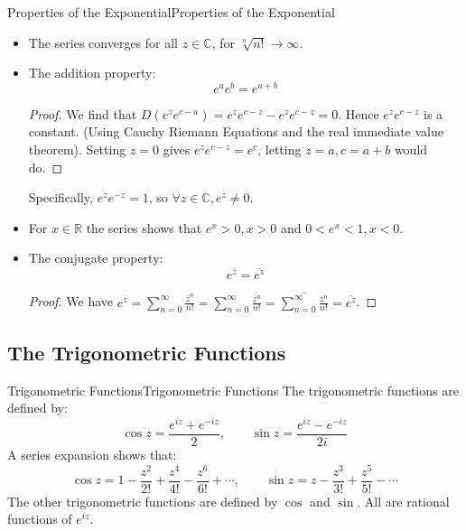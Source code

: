 \documentclass[../main.tex]{subfiles}
\begin{document}
\begin{proposition}{Properties of the Exponential}{Properties of the Exponential}
\begin{itemize}
	\item The series converges for all $z\in \mathbb{C}$, for $\sqrt[n]{n!} \rightarrow \infty $.
	\item The addition property:
		\begin{equation}
			e^a e^b = e^{a+b}
		\end{equation}
	\begin{proof}
	We find that $D(e^ze^{c-a}) = e^ze^{c-z} - e^ze^{c-z} = 0$. Hence $e^ze^{c-z}$ is a constant. (Using Cauchy Riemann Equations and the real immediate value theorem). Setting $z=0$ gives $e^ze^{c-z} = e^c$, letting $z=a,c=a+b$ would do.
	\end{proof}

	Specifically, $e^ze^{-z} = 1$, so $\forall z\in \mathbb{C},e^z\neq 0$.
\item For $x\in \mathbb{R}$ the series shows that $e^x>0,x>0$ and $0<e^x<1,x<0$.
\item The conjugate property:
	\begin{equation}
		e^{\overline{z}} = \overline{e^z}
	\end{equation}
	\begin{proof}
	We have $\displaystyle e^{\overline{z}} = \sum_{n=0}^{\infty } \frac{\overline{z}^n}{n!} = \sum_{n=0}^{\infty } \frac{\overline{z^n}}{n!} = \overline{\sum_{n=0}^{\infty } \frac{z^n}{n!}} = \overline{e^z}$.
	\end{proof}
\end{itemize}
\end{proposition}

\subsection{The Trigonometric Functions}
\begin{definition}{Trigonometric Functions}{Trigonometric Functions}
The trigonometric functions are defined by:
\begin{equation}
	\cos z = \frac{e^{iz}+e^{-iz}}{2}, \qquad \sin z = \frac{e^{iz}-e^{-iz}}{2i}
\end{equation}
A series expansion shows that:
\begin{equation}
	\cos z = 1 - \frac{z^2}{2!} + \frac{z^4}{4!} - \frac{z^6}{6!} + \cdots, \qquad \sin z = z - \frac{z^3}{3!} + \frac{z^5}{5!} - \cdots
\end{equation}
The other trigonometric functions are defined by $\cos $ and $\sin $. All are rational functions of $e^{iz}$.
\end{definition}
\end{document}
